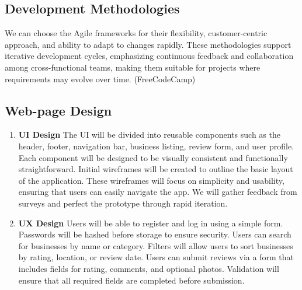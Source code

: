 \documentclass[10pt,twocolumn]{article}
\begin{document}
\subsection{Development Methodologies}
We can choose the Agile frameworks for their flexibility, customer-centric approach, and ability to adapt to changes rapidly. These methodologies support iterative development cycles, emphasizing continuous feedback and collaboration among cross-functional teams, making them suitable for projects where requirements may evolve over time. (FreeCodeCamp)

    \subsection{Web-page Design}
    \begin{enumerate}
        \item \textbf{UI Design} The UI will be divided into reusable components such as the header, footer, navigation bar, business listing, review form, and user profile. Each component will be designed to be visually consistent and functionally straightforward.
Initial wireframes will be created to outline the basic layout of the application. These wireframes will focus on simplicity and usability, ensuring that users can easily navigate the app. We will gather feedback from surveys and perfect the prototype through rapid iteration. 
        \item \textbf{UX Design} Users will be able to register and log in using a simple form. Passwords will be hashed before storage to ensure security. Users can search for businesses by name or category. Filters will allow users to sort businesses by rating, location, or review date. Users can submit reviews via a form that includes fields for rating, comments, and optional photos. Validation will ensure that all required fields are completed before submission.      
    \end{enumerate}
\end{document}
